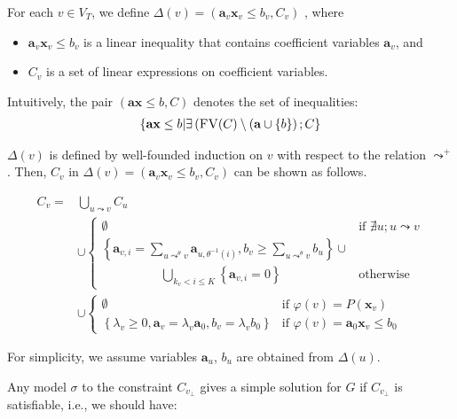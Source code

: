 \documentclass[a4paper,12pt]{article}
\begin{document}
For each $v \in V_T$, we define
$\Delta(v) = (\mathbf{a}_v \mathbf{x}_v \leq b_v, C_v)$
, where
\begin{itemize}
\item $\mathbf{a}_v \mathbf{x}_v \leq b_v$ is a linear inequality that
  contains coefficient variables $\mathbf{a}_v$, and
\item $C_v$ is a set of linear expressions on coefficient variables.
\end{itemize}
Intuitively, the pair $(\mathbf{a} \mathbf{x} \leq b, C)$ denotes the
set of inequalities:
\begin{align*}
\left\lbrace
 \mathbf{a} \mathbf{x} \leq b \middle|
 \exists \left( \textsc{FV}(C)
  \setminus (\mathbf{a} \cup \left\lbrace b \right\rbrace
 \right); C
\right\rbrace
\end{align*}

$\Delta(v)$ is defined by well-founded induction on $v$ with respect
to the relation $\leadsto^+$. Then, $C_v$ in
$\Delta(v) = \left( \mathbf{a}_v \mathbf{x}_v \leq b_v, C_v \right)$
can be shown as follows.

\begin{align*}
C_v = & \bigcup_{u \leadsto v} C_u
\\
& \cup \begin{cases}
\emptyset
& \mbox{if } \nexists u; u \leadsto v \\
\left\lbrace
 \mathbf{a}_{v,i} = \sum_{u \mathop{\leadsto}^\theta v} \mathbf{a}_{u, \theta^{-1} (i)},
 b_v \geq \sum_{u \mathop{\leadsto}^\theta v} b_u
\right\rbrace \cup \\
\hspace{2cm} \bigcup_{k_v < i \leq K} \left\lbrace \mathbf{a}_{v,i} = 0 \right\rbrace
& \mbox{otherwise}
\end{cases}
\\
& \cup \begin{cases}
\emptyset
& \mbox{if } \varphi(v) = P(\mathbf{x}_v) \\
\left\lbrace
 \lambda_v \geq 0, \mathbf{a}_v = \lambda_v \mathbf{a}_0,
 b_v = \lambda_v b_0
\right\rbrace
& \mbox{if } \varphi(v) = \mathbf{a}_0 \mathbf{x}_v \leq b_0
\end{cases}
\end{align*}

For simplicity, we assume variables $\mathbf{a}_u$, $b_u$ are obtained
from $\Delta(u)$.

Any model $\sigma$ to the constraint $C_{v_\bot}$ gives a simple
solution for $G$ if $C_{v_\bot}$ is satisfiable, i.e., we should have:
\end{document}
